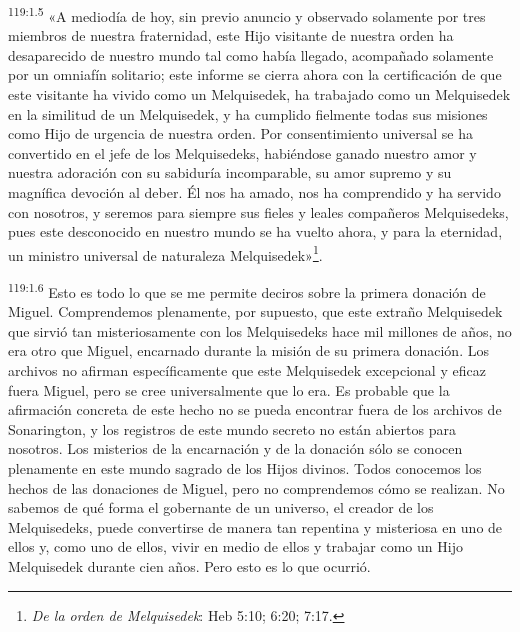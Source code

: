 \par
\textsuperscript{119:1.5} «A mediodía de hoy, sin previo anuncio y observado solamente por tres miembros de nuestra fraternidad, este Hijo visitante de nuestra orden ha desaparecido de nuestro mundo tal como había llegado, acompañado solamente por un omniafín solitario; este informe se cierra ahora con la certificación de que este visitante ha vivido como un Melquisedek, ha trabajado como un Melquisedek en la similitud de un Melquisedek, y ha cumplido fielmente todas sus misiones como Hijo de urgencia de nuestra orden. Por consentimiento universal se ha convertido en el jefe de los Melquisedeks, habiéndose ganado nuestro amor y nuestra adoración con su sabiduría incomparable, su amor supremo y su magnífica devoción al deber. Él nos ha amado, nos ha comprendido y ha servido con nosotros, y seremos para siempre sus fieles y leales compañeros Melquisedeks, pues este desconocido en nuestro mundo se ha vuelto ahora, y para la eternidad, un ministro universal de naturaleza Melquisedek»\footnote{\textit{De la orden de Melquisedek}: Heb 5:10; 6:20; 7:17.}.

\par
\textsuperscript{119:1.6} Esto es todo lo que se me permite deciros sobre la primera donación de Miguel. Comprendemos plenamente, por supuesto, que este extraño Melquisedek que sirvió tan misteriosamente con los Melquisedeks hace mil millones de años, no era otro que Miguel, encarnado durante la misión de su primera donación. Los archivos no afirman específicamente que este Melquisedek excepcional y eficaz fuera Miguel, pero se cree universalmente que lo era. Es probable que la afirmación concreta de este hecho no se pueda encontrar fuera de los archivos de Sonarington, y los registros de este mundo secreto no están abiertos para nosotros. Los misterios de la encarnación y de la donación sólo se conocen plenamente en este mundo sagrado de los Hijos divinos. Todos conocemos los hechos de las donaciones de Miguel, pero no comprendemos cómo se realizan. No sabemos de qué forma el gobernante de un universo, el creador de los Melquisedeks, puede convertirse de manera tan repentina y misteriosa en uno de ellos y, como uno de ellos, vivir en medio de ellos y trabajar como un Hijo Melquisedek durante cien años. Pero esto es lo que ocurrió.

